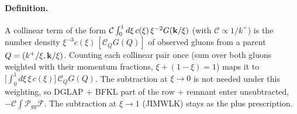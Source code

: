 \paragraph{Definition.} A collinear term of the form $\mathcal C\int_0^1d\xi\,c(\xi)\,\xi^{-2}G(\mathbf{k}/\xi)$ (with $\mathcal C\propto1/k^+$) is the number density $\xi^{-3}c(\xi)\,[\mathcal C_QG(Q)]$ of observed gluons from a parent $Q=(k^+/\xi,\mathbf{k}/\xi)$. Counting each collinear pair once (sum over both gluons weighted with their momentum fractions, $\xi+(1-\xi)=1$) maps it to $\big[\int_0^1d\xi\,\xi\,c(\xi)\big]\,\mathcal C_QG(Q)$. The subtraction at $\xi\to0$ is not needed under this weighting, so DGLAP $+$ BFKL part of the row $+$ remnant enter unsubtracted, $-\mathcal C\int\mathcal P_{gg}\mathcal F$. The subtraction at $\xi\to1$ (JIMWLK) stays as the plus prescription.

